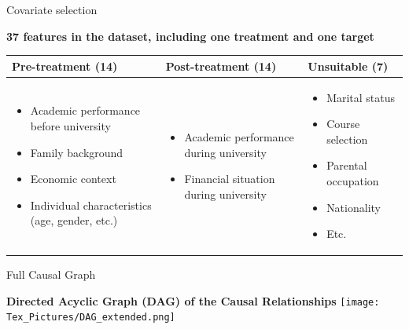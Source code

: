 \documentclass[aspectratio=169]{beamer}
\begin{document}
\begin{frame}{Covariate selection}

	\textbf{37 features in the dataset, including one treatment and one target}
	\vspace{10pt}
	
	\begin{tabularx}{\textwidth}{X | X | X}
	\textbf{Pre-treatment (14)}  & \textbf{Post-treatment (14)} & \textbf{Unsuitable (7)} \\[0.5ex]
	\hline \hline 
	\parbox[t]{4cm}{\vspace{-12pt} \begin{itemize}
	[label=--,leftmargin=1.2em,itemsep=1pt,topsep=2pt]
    \item Academic performance before university
    \item Family background
    \item Economic context
    \item Individual characteristics (age, gender, etc.)
	\end{itemize}} 

	&
	\parbox[t]{4cm}{
	\vspace{-12pt}
	\begin{itemize}[label=--,leftmargin=1.2em,itemsep=1pt,topsep=2pt]
    	\item Academic performance during university
    	\item Financial situation during university
	\end{itemize}}
	&
	\parbox[t]{4cm}{\vspace{-12pt} 
	\begin{itemize}[label=--,leftmargin=1.2em,itemsep=1pt,topsep=2pt]
    	\item Marital status
    	\item Course selection
    	\item Parental occupation
    	\item Nationality
    	\item Etc.
	\end{itemize}} 
	\end{tabularx}


\end{frame}

\begin{frame}{Full Causal Graph}
	\begin{center}
	\textbf{Directed Acyclic Graph (DAG) of the Causal Relationships}
	\hspace*{-1cm}
     \texttt{[image: Tex\_Pictures/DAG\_extended.png]}
     \end{center}
\end{frame}
\end{document}
